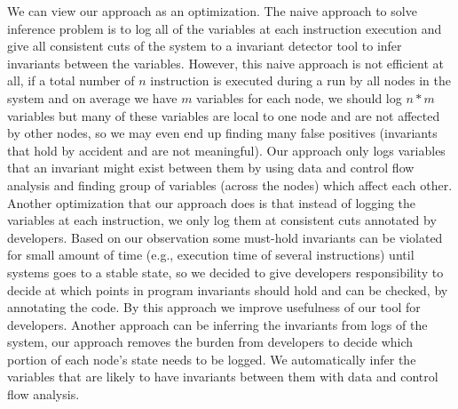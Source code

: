 We can view our approach as an optimization. The naive approach to solve inference problem is to log all of the variables at each instruction execution and give all consistent cuts of the system to a invariant detector tool to infer invariants between the variables. However, this naive approach is not efficient at all, if a total number of $n$ instruction is executed during a run by all nodes in the system and on average we have $m$ variables for each node, we should log $n*m$ variables but many of these variables are local to one node and are not affected by other nodes, so we may even end up finding many false positives (invariants that hold by accident and are not meaningful). Our approach only logs variables that an invariant might exist between them by using data and control flow analysis and finding group of variables (across the nodes) which affect each other. 
Another optimization that our approach does is that instead of logging the variables at each instruction, we only log them at consistent cuts annotated by developers. Based on our observation some must-hold invariants can be violated for small amount of time (e.g., execution time of several instructions) until systems goes to a stable state, so we decided to give developers responsibility to decide at which points in program invariants should hold and can be checked, by annotating the code. By this approach we improve usefulness of our tool for developers. Another approach can be inferring the invariants from logs of the system, our approach removes the burden from developers to decide which portion of each node's state needs to be logged. We automatically infer the variables that are likely to have invariants between them with data and control flow analysis.
